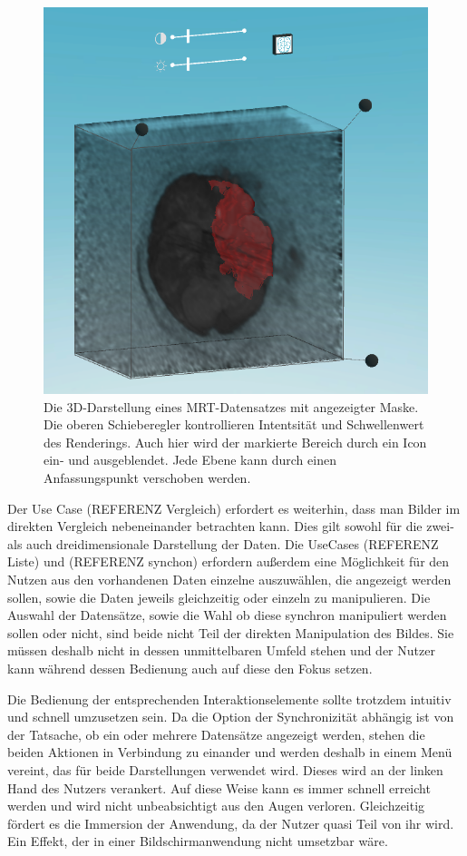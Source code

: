 \begin{figure}
	\centering
	\includegraphics[width=0.5\linewidth]{images/mARt3d.png}
	\caption{Die 3D-Darstellung eines MRT-Datensatzes mit angezeigter Maske. Die oberen Schieberegler kontrollieren Intentsität und Schwellenwert des Renderings. Auch hier wird der markierte Bereich durch ein Icon ein- und ausgeblendet. Jede Ebene kann durch einen Anfassungspunkt verschoben werden.}
	\label{img:mARt3d}
\end{figure}


Der Use Case (REFERENZ Vergleich) erfordert es weiterhin, dass man Bilder im direkten Vergleich nebeneinander betrachten kann. Dies gilt sowohl für die zwei- als auch dreidimensionale Darstellung der Daten. Die UseCases (REFERENZ Liste) und (REFERENZ synchon) erfordern außerdem eine Möglichkeit für den Nutzen aus den vorhandenen Daten einzelne auszuwählen, die angezeigt werden sollen, sowie die Daten jeweils gleichzeitig oder einzeln zu manipulieren. 
Die Auswahl der Datensätze, sowie die Wahl ob diese synchron manipuliert werden sollen oder nicht, sind beide nicht Teil der direkten Manipulation des Bildes. Sie müssen deshalb nicht in dessen unmittelbaren Umfeld stehen und der Nutzer kann während dessen Bedienung auch auf diese den Fokus setzen.
 
Die Bedienung der entsprechenden Interaktionselemente sollte trotzdem intuitiv und schnell umzusetzen sein. Da die Option der Synchronizität abhängig ist von der Tatsache, ob ein oder mehrere Datensätze angezeigt werden, stehen die beiden Aktionen in Verbindung zu einander und werden deshalb in einem Menü vereint, das für beide Darstellungen verwendet wird. Dieses wird an der linken Hand des Nutzers verankert. Auf diese Weise kann es immer schnell erreicht werden und wird nicht unbeabsichtigt aus den Augen verloren. Gleichzeitig fördert es die Immersion der Anwendung, da der Nutzer quasi Teil von ihr wird. Ein Effekt, der in einer Bildschirmanwendung nicht umsetzbar wäre. 

